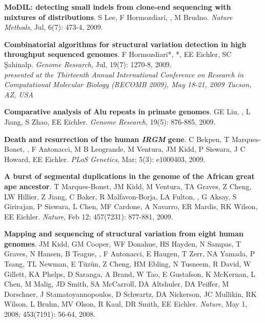 \vspace{-.2cm}
    {\bf MoDIL: detecting small indels from clone-end sequencing with mixtures of distributions}.
    S Lee, F Hormozdiari, \calkan{}, M Brudno.
    {\em Nature Methods},  Jul, 6(7): 473-4, 2009.
    



\vspace{-.2cm}
{\bf  Combinatorial algorithms for structural variation detection in high throughput sequenced genomes}.
F Hormozdiari*, \calkan{}*, EE Eichler, SC \c{S}ahinalp. 
{\em Genome Research}, Jul, 19(7): 1270-8, 2009.\\
\hspace*{1cm} {\footnotesize {\it presented at the
 Thirteenth Annual International Conference on Research in Computational Molecular 
Biology (RECOMB 2009), May 18-21, 2009 Tucson, AZ, USA}}



\vspace{-.2cm}

{\bf Comparative analysis of Alu repeats in primate genomes}.  GE Liu, \calkan{}, L Jiang, S Zhao, EE Eichler. 
{\em Genome Research}, 19(5): 876-885, 2009.



\clearpage

\vspace{-.2cm}
{\bf Death and resurrection of the human {\em IRGM} gene}. C Bekpen, T Marques-Bonet,
\calkan{}, F Antonacci, M B Leogrande, M Ventura, JM Kidd, P Siswara, J C Howard, EE Eichler. {\em PLoS Genetics}, Mar; 5(3): e1000403, 2009.

\vspace{-.2cm}

{\bf A burst of segmental duplications in the genome of the African great ape ancestor}. T Marques-Bonet, JM Kidd, M Ventura, TA Graves, Z Cheng, LW Hillier, Z Jiang, 
C Baker, R Malfavon-Borja, LA Fulton, \calkan{}, G Aksay, S Girirajan,
 P Siswara, L Chen, MF Cardone, A Navarro, ER Mardis,
 RK Wilson, EE Eichler. {\em Nature}, Feb 12; 457(7231): 877-881, 2009.


\vspace{-.2cm}
 {\bf Mapping and sequencing of structural variation from eight human genomes}.
 JM Kidd, GM Cooper, WF Donahue, HS Hayden, 
 N Sampas, T Graves, N Hansen, B Teague, \calkan{},  F Antonacci, 
 E Haugen, T Zerr, NA Yamada, P Tsang,  TL Newman, E T\"{u}z\"{u}n, 
 Z Cheng, HM Ebling, N Tusneem, R David, W Gillett, KA Phelps, 
 D Saranga, A Brand, W Tao, E Gustafson, K McKernan, L Chen, 
 M Malig, JD Smith, SA McCarroll, DA Altshuler,  
 DA Peiffer, M Dorschner, J Stamatoyannopoulos, D Schwartz,  
 DA Nickerson, JC Mullikin, RK Wilson, L Bruhn, 
 MV Olson, R Kaul, DR Smith, EE Eichler.
 {\em Nature}, May 1, 2008; 453(7191): 56-64, 2008.


